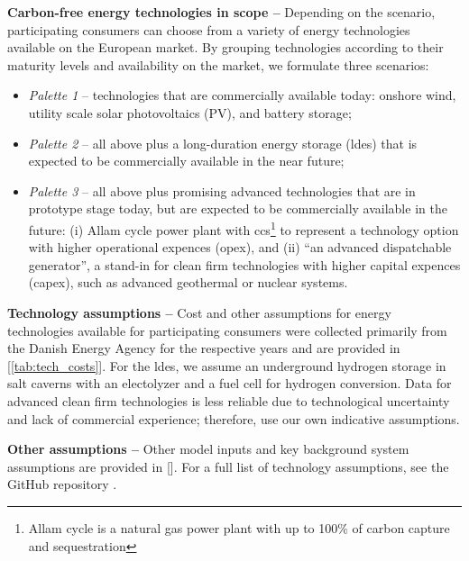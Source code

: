 \textbf{Carbon-free energy technologies in scope --} Depending on the scenario, participating consumers can choose from a variety of energy technologies available on the European market. By grouping technologies according to their maturity levels and availability on the market, we formulate three scenarios:

\begin{itemize}[-]
    \item \textit{Palette 1} -- technologies that are commercially available today: onshore wind, utility scale solar photovoltaics (\gls{PV}), and battery storage;
    \item \textit{Palette 2} -- all above plus a long-duration energy storage (\gls{ldes}) that is expected to be commercially available in the near future; 
    \item \textit{Palette 3} -- all above plus promising advanced technologies that are in prototype stage today, but are expected to be commercially available in the future: (i) Allam cycle power plant with \gls{ccs}\footnote{Allam cycle is a natural gas power plant with up to 100\% of carbon capture and sequestration} to represent a technology option with higher operational expences (\gls{opex}), and (ii) \enquote{an advanced dispatchable generator}, a stand-in for clean firm technologies with higher capital expences (\gls{capex}), such as advanced geothermal or nuclear systems.
\end{itemize}

\textbf{Technology assumptions --} Cost and other assumptions for energy technologies available for participating consumers were collected primarily from the Danish Energy Agency \cite{DEA-technologydata} for the respective years and are provided in [\cref{tab:tech_costs}].
For the \gls{ldes}, we assume an underground hydrogen storage in salt caverns with an electolyzer and a fuel cell for hydrogen conversion. 
Data for advanced clean firm technologies is less reliable due to technological uncertainty and lack of commercial experience; therefore, use our own indicative assumptions.

\textbf{Other assumptions --} Other model inputs and key background system assumptions are provided in []. For a full list of technology assumptions, see the GitHub repository \cite{github-247CFEpaper}.